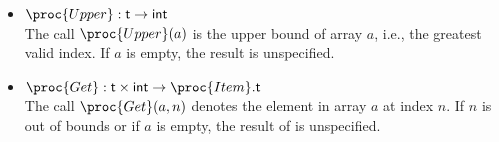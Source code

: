 \documentclass[11pt,a4paper]{article}
\newcommand\type[1]{\textsf{#1}}
\begin{document}
\begin{itemize}
\begin{itemize}
    \item \(\proc{Upper} : \type{t} \rightarrow \type{int}\)\\
    The call \(\proc{Upper} (a)\) is the upper bound of array
    \(a\), i.e., the greatest valid index. If \(a\) is empty, the
    result is unspecified.

    \item \(\proc{Get} : \type{t} \times \type{int} \rightarrow
    \proc{Item}.\type{t}\)\\
    The call \(\proc{Get} (a, n)\) denotes the element in
    array \(a\) at index \(n\). If \(n\) is out of bounds or if
    \(a\) is empty, the result of  is unspecified.

  \end{itemize}

\end{itemize}



\end{document}
